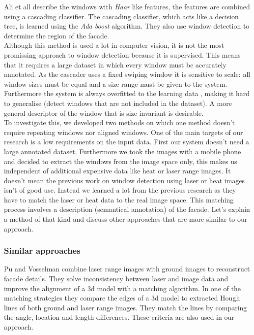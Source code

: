 Ali et all \cite{Ali_facades} describe the windows with \emph{Haar} like
features, the features are combined using a cascading classifier. The cascading
classifier, which acts like a decision tree, is learned using the \emph{Ada
boost} algorithm.  They also use window detection to determine the region of
the facade.\\

Although this method is used a lot in computer vision, it is not the most
promissing approach to window detection because it is supervised.  This means
that it requires a large dataset in which every window must be accurately
annotated.  As the cascader uses a fixed swiping window it is sensitive to
scale: all window sizes must be equal and a size range must be given to the system.
Furthermore the system is always overfitted to the learning data
, making it hard to generalise (detect windows that are
not included in the dataset).  A more general descriptor of the window that is
size invariant is desirable.\\


To investigate this, we developed two methods on which one method doesn't
require repeating windows nor aligned windows.  One of the main targets of our research
is a low requirements on the input data.  First our system doesn't need 
a large annotated dataset. Furthermore we took the images with a mobile phone
and decided to extract the windows from the image space only, this makes us
independent of additional expensive data like heat or laser range images.
It doesn't mean the previous work on window detection using laser or heat
images isn't of good use.  Instead we learned a lot from the previous research
as they have to match the laser or heat data to the real image space.  This
matching process involves a description (semantical annotation) of the facade.
Let's explain a method of that kind and discuss other approaches that are more
similar to our approach.\\

\subsubsection{Similar approaches}
Pu and Vosselman \cite{Pu_refiningbuilding} combine laser range images with
ground images to reconstruct facade details.  They solve inconsistency between
laser and image data and improve the alignment of a 3d model with a matching
algorithm.  In one of the matching strategies they compare the edges of a 3d
model to extracted Hough lines of both ground and laser range images.  They
match the lines by comparing the angle, location and length differences. These
criteria are also used in our approach.\\

